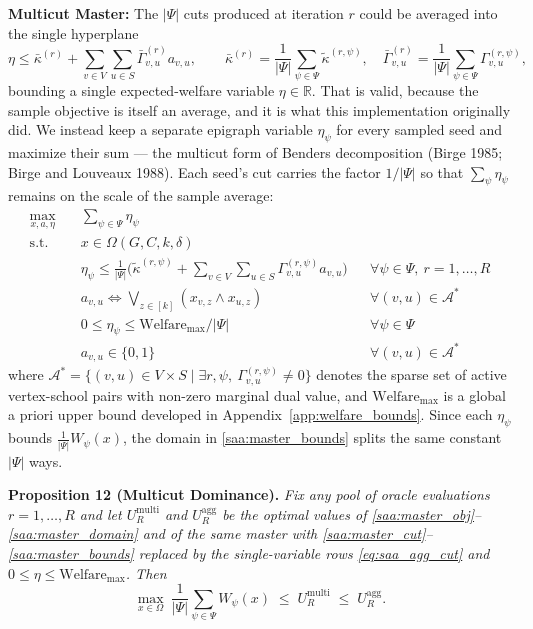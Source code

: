 \documentclass{article}
\begin{document}
\noindent\textbf{Multicut Master:}
The $|\Psi|$ cuts produced at iteration $r$ could be averaged into the single hyperplane
\begin{equation}\label{eq:saa_agg_cut}
\eta \leq \bar{\kappa}^{(r)} + \sum_{v \in V} \sum_{u \in S} \bar{\Gamma}_{v, u}^{(r)} a_{v, u},
\qquad
\bar{\kappa}^{(r)} = \frac{1}{|\Psi|} \sum_{\psi \in \Psi} \tilde{\kappa}^{(r, \psi)}, \quad \bar{\Gamma}_{v, u}^{(r)} = \frac{1}{|\Psi|} \sum_{\psi \in \Psi} \Gamma_{v, u}^{(r, \psi)},
\end{equation}
bounding a single expected-welfare variable $\eta \in \mathbb{R}$. That is valid, because the sample objective is itself an average, and it is what this implementation originally did. We instead keep a separate epigraph variable $\eta_\psi$ for every sampled seed and maximize their sum --- the multicut form of Benders decomposition (Birge 1985; Birge and Louveaux 1988). Each seed's cut carries the factor $1/|\Psi|$ so that $\sum_\psi \eta_\psi$ remains on the scale of the sample average:
\begin{align}
\max_{x, a, \eta} \quad & \sum_{\psi \in \Psi} \eta_\psi \label{saa:master_obj} \\
\textrm{s.t.} \quad & x \in \Omega(G, C, k, \delta) \label{saa:master_omega} \\
& \eta_\psi \leq \frac{1}{|\Psi|} \Big( \tilde{\kappa}^{(r, \psi)} + \sum_{v \in V} \sum_{u \in S} \Gamma_{v, u}^{(r, \psi)} a_{v, u} \Big) && \forall \psi \in \Psi, \ r = 1, \dots, R \label{saa:master_cut} \\
& a_{v, u} \iff \bigvee_{z \in [k]} (x_{v, z} \land x_{u, z}) && \forall (v, u) \in \mathcal{A}^* \label{saa:master_access} \\
& 0 \leq \eta_\psi \leq \text{Welfare}_{\max} / |\Psi| && \forall \psi \in \Psi \label{saa:master_bounds} \\
& a_{v, u} \in \{0, 1\} && \forall (v, u) \in \mathcal{A}^* \label{saa:master_domain}
\end{align}
where $\mathcal{A}^* = \{(v, u) \in V \times S \mid \exists r, \psi, \ \Gamma_{v, u}^{(r, \psi)} \neq 0\}$ denotes the sparse set of active vertex-school pairs with non-zero marginal dual value, and $\text{Welfare}_{\max}$ is a global a priori upper bound developed in Appendix~\ref{app:welfare_bounds}. Since each $\eta_\psi$ bounds $\frac{1}{|\Psi|} W_\psi(x)$, the domain in \eqref{saa:master_bounds} splits the same constant $|\Psi|$ ways.

\noindent\textbf{Proposition 12 (Multicut Dominance).} \textit{Fix any pool of oracle evaluations $r = 1, \dots, R$ and let $U^{\mathrm{multi}}_R$ and $U^{\mathrm{agg}}_R$ be the optimal values of \eqref{saa:master_obj}--\eqref{saa:master_domain} and of the same master with \eqref{saa:master_cut}--\eqref{saa:master_bounds} replaced by the single-variable rows \eqref{eq:saa_agg_cut} and $0 \le \eta \le \text{Welfare}_{\max}$. Then}
\begin{equation}\label{eq:saa_multicut_chain}
\max_{x \in \Omega} \ \frac{1}{|\Psi|} \sum_{\psi \in \Psi} W_\psi(x) \;\leq\; U^{\mathrm{multi}}_R \;\leq\; U^{\mathrm{agg}}_R .
\end{equation}
\end{document}
